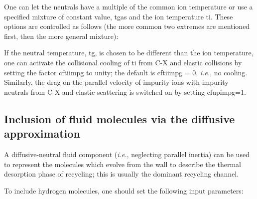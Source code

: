\documentclass [12pt]{article}
\def\hsa{\hskip.4truein}
\begin{document}
One can let the neutrals have a multiple of the common ion temperature or
use a specified mixture of constant value, {\sf tgas} and the ion temperature
{\sf ti}.  These options are controlled as follows (the more common two 
extremes are mentioned first, then the more general mixture):
{\sf
{}
}

If the neutral temperature, {\sf tg}, is chosen to be different than the ion
temperature, one can activate the collisional cooling of {\sf ti} from C-X and
elastic collisions by setting the factor {\sf cftiimpg} to unity; the default
is {\sf cftiimpg = 0}, {\it i.e.}, no cooling.  Similarly, the drag on the
parallel velocity of impurity ions with impurity neutrals from C-X and elastic
scattering is switched on by setting {\sf cfupimpg=1}.

\subsection{Inclusion of fluid molecules via the diffusive approximation}

A diffusive-neutral fluid component ({\it i.e.}, neglecting parallel inertia)
can be used to represent the molecules which evolve from the wall to describe
the thermal desorption phase of recycling; this is usually the dominant
recycling channel.

To include hydrogen molecules, one should set the following input parameters:
\end{document}
